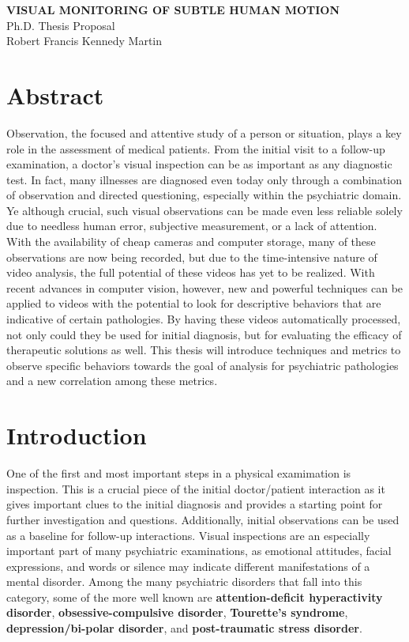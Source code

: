 \documentclass[11pt]{article}
\begin{document}

%
\newpage
\thispagestyle{empty}
\begin{center}
\textbf{VISUAL MONITORING OF SUBTLE HUMAN MOTION}\\
Ph.D. Thesis Proposal\\
\bigskip
Robert Francis Kennedy Martin\\
\end{center}
\clearpage
{}
\section{Abstract}
\noindent
Observation, the focused and attentive study of a person or situation, plays a key role in the assessment of medical patients. From the initial visit to a follow-up examination, a doctor's visual inspection can be as important as any diagnostic test. In fact, many illnesses are diagnosed even today only through a combination of observation and directed questioning, especially within the psychiatric domain. Ye although crucial, such visual observations can be made even less reliable solely due to needless human error, subjective measurement, or a lack of attention. With the availability of cheap cameras and computer storage, many of these observations are now being recorded, but due to the time-intensive nature of video analysis, the full potential of these videos has yet to be realized. With recent advances in computer vision, however, new and powerful techniques can be applied to videos with the potential to look for descriptive behaviors that are indicative of certain pathologies. By having these videos automatically processed, not only could they be used for initial diagnosis, but for evaluating the efficacy of therapeutic solutions as well. This thesis will introduce techniques and metrics to observe specific behaviors towards the goal of analysis for psychiatric pathologies and a new correlation among these metrics.
\section{Introduction}
\noindent
One of the first and most important steps in a physical examimation is inspection. This is a crucial piece of the initial doctor/patient interaction as it gives important clues to the initial diagnosis and provides a starting point for further investigation and questions. Additionally, initial observations can be used as a baseline for follow-up interactions. Visual inspections are an especially important part of many psychiatric examinations, as emotional attitudes, facial expressions, and words or silence may indicate different manifestations of a mental disorder. Among the many psychiatric disorders that fall into this category, some of the more well known are \textbf{attention-deficit hyperactivity disorder}, \textbf{obsessive-compulsive disorder}, \textbf{Tourette's syndrome}, \textbf{depression/bi-polar disorder}, and \textbf{post-traumatic stress disorder}.
\end{document}
